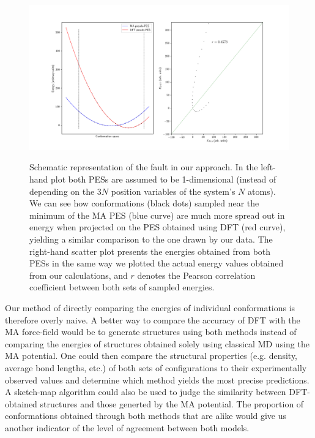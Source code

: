 \documentclass[aps,prb,twocolumn,amsmath,amssymb,superscriptaddress,longbibliography]{revtex4-1}
\newcommand\tab[1][1cm]{\hspace*{#1}} %
\begin{document}
\begin{figure}
\centering
\includegraphics[scale=0.5]{./plots/pseudo-PES}
\label{pes}
\caption{Schematic representation of the fault in our approach. In the left-hand plot both PESs are assumed to be 1-dimensional (instead of depending on the $3N$ position variables of the system's $N$ atoms). We can see how conformations (black dots) sampled near the minimum of the MA PES (blue curve) are much more spread out in energy when projected on the PES obtained using DFT (red curve), yielding a similar comparison to the one drawn by our data. The right-hand scatter plot presents the energies obtained from both PESs in the same way we plotted the actual energy values obtained from our calculations, and $r$ denotes the Pearson correlation coefficient between both sets of sampled energies.}
\end{figure}

\tab Our method of directly comparing the energies of individual conformations is therefore overly naive.
A better way to compare the accuracy of DFT with the MA force-field would be to generate structures using both methods instead of comparing the energies of structures obtained solely using classical MD using the MA potential.
One could then compare the structural properties (e.g. density, average bond lengths, etc.) of both sets of configurations to their experimentally observed values and determine which method yields the most precise predictions.
A sketch-map\cite{sketch-map} algorithm could also be used to judge the similarity between DFT-obtained structures and those generted by the MA potential.
The proportion of conformations obtained through both methods that are alike would give us another indicator of the level of agreement between both models. 
\end{document}
